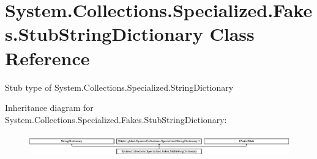 \hypertarget{class_system_1_1_collections_1_1_specialized_1_1_fakes_1_1_stub_string_dictionary}{\section{System.\-Collections.\-Specialized.\-Fakes.\-Stub\-String\-Dictionary Class Reference}
\label{class_system_1_1_collections_1_1_specialized_1_1_fakes_1_1_stub_string_dictionary}
}


Stub type of System.\-Collections.\-Specialized.\-String\-Dictionary 


Inheritance diagram for System.\-Collections.\-Specialized.\-Fakes.\-Stub\-String\-Dictionary\-:\begin{figure}[H]
\begin{center}
\leavevmode
\includegraphics[height=0.982456cm]{class_system_1_1_collections_1_1_specialized_1_1_fakes_1_1_stub_string_dictionary}
\end{center}
\end{figure}
